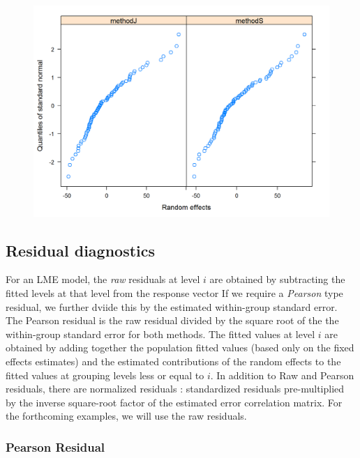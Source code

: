 \documentclass[12pt, a4paper]{report}
\theoremstyle{plain}
\theoremstyle{definition}
\theoremstyle{remark}
\begin{document}
	\begin{figure}[h!]
		\centering
		\includegraphics[width=0.9\linewidth]{images/ResidPlot2}
		\caption{}
		\label{fig:ResidPlot2}
	\end{figure}
	
	
	
	
	

	\subsection{Residual diagnostics} %
	
	
	For an LME model, the \textit{raw} residuals at level $i$ are obtained by subtracting the fitted levels at that level from the response vector If we require a \textit{Pearson} type residual, we further dviide this by the estimated within-group standard error. The Pearson residual is the raw residual divided by the square root of the the within-group standard error for both methods. The fitted values at level $i$ are obtained by adding together the population fitted values (based only on the fixed effects estimates) and the estimated contributions of the random effects to the fitted values at grouping levels less or equal to $i$. In addition to Raw and Pearson residuals, there are normalized residuals : standardized residuals pre-multiplied by the inverse square-root factor of the estimated error correlation matrix. For the forthcoming examples, we will use the raw residuals.
		\subsubsection{Pearson Residual}%
		
\end{document}
